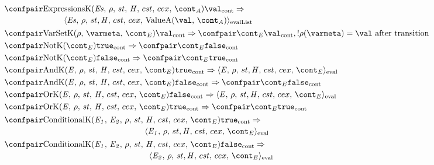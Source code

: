 \documentclass{article}
\newcommand{\cesktrans}[2]{\ensuremath{{#1} \Rightarrow {#2}}}
\newcommand{\cesktranssplit}[2]{\ensuremath{{#1} \Rightarrow\\ {#2}}}
\newcommand{\cesktranswhere}[3]{\ensuremath{{#1} \Rightarrow {#2}, {#3}}}
\begin{document}
\begin{figure}[Htp]
	\begin{align}
		&\begin{multlined}
        \cesktranssplit%
            {\contconf{\ExpressionsK{\exprs}{\env}{\acont}}{\val}}%
            {\evallistconf{\exprs}{\env}{\strace}{\cstrace}{\cex}{\ValueA{\val}{\acont}}}
        \end{multlined}
        \label{econtconf:exprs}\\
		&\cesktranswhere%
			{\contconf{\VarSetK{\env}{\varmeta}{\econt}}{\val}}%
			{\contconf{\econt}{\val}}%
			{\deref{\env(\varmeta)} = \val \text{ after transition}}
			\label{econtconf:varset}\\
		&\cesktrans%
			{\contconf{\NotK{\econt}}{\true}}%
			{\contconf{\econt}{\false}}
        \label{econtconf:not-true}\\
		&\cesktrans%
			{\contconf{\NotK{\econt}}{\false}}%
			{\contconf{\econt}{\true}}
        \label{econtconf:not-false}\\
		&\cesktrans%
			{\contconf{\AndK{\expressionmeta}{\env}{\econt}}{\true}}%
			{\evalconf{\expressionmeta}{\env}{\strace}{\cstrace}{\cex}{\econt}}
        \label{econtconf:and-true}\\
		&\cesktrans%
			{\contconf{\AndK{\expressionmeta}{\env}{\econt}}{\false}}%
			{\contconf{\econt}{\false}}
        \label{econtconf:and-false}\\
		&\cesktrans%
			{\contconf{\OrK{\expressionmeta}{\env}{\econt}}{\false}}%
			{\evalconf{\expressionmeta}{\env}{\strace}{\cstrace}{\cex}{\econt}}
        \label{econtconf:or-false}\\
		&\cesktrans%
			{\contconf{\OrK{\expressionmeta}{\env}{\econt}}{\true}}%
			{\contconf{\econt}{\true}}
        \label{econtconf:or-true}\\
		&\begin{multlined}
		\cesktranssplit%
			{\contconf{\ConditionalK{\expri{1}}{\expri{2}}{\env}{\econt}}{\true}}%
			{\evalconf{\expri{1}}{\env}{\strace}{\cstrace}{\cex}{\econt}}
        \end{multlined}
        \label{econtconf:cond-true}\\
		&\begin{multlined}
		\cesktranssplit%
			{\contconf{\ConditionalK{\expri{1}}{\expri{2}}{\env}{\econt}}{\false}}%
			{\evalconf{\expri{2}}{\env}{\strace}{\cstrace}{\cex}{\econt}}
        \end{multlined}
        \label{econtconf:cond-false}\\
		&\begin{multlined}

\end{multlined}
\end{align}
\end{figure}
\end{document}
